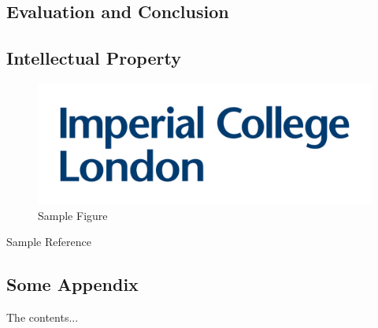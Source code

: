 \documentclass[a4paper]{article}
\begin{document}
\section{Evaluation and Conclusion}

\section{Intellectual Property}

\newpage

\printbibliography[
heading=bibintoc,
title={References}
]


\begin{figure}[H]
\centering
\includegraphics[scale=0.18]{logo.png}
\caption{Sample Figure}
\label{fig:image1}
\end{figure}

Sample Reference\cite{einstein}


\begin{appendices}
\chapter{Some Appendix}
The contents...
\end{appendices}
\end{document}
